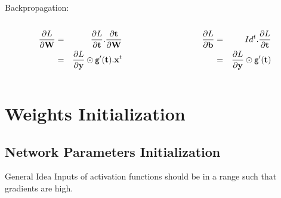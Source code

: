 \documentclass{book}
\newcommand{\x}{\mathbf{x}}
\newcommand{\y}{\mathbf{y}}
\newcommand{\W}{\mathbf{W}} %
\newcommand{\bias}{\mathbf{b}}%
\newcommand{\act}{\texttt{g}}%
\newcommand{\loss}{L}
\begin{document}
Backpropagation:
\begin{columns}
\begin{column}{.5\textwidth}
\begin{eqnarray*}
\pdv{\loss}{\W} &=& \pdv{\loss}{\mathbf{t}}.\pdv{\mathbf{t}}{\W} \\
&=& \pdv{\loss}{\y} \odot \act'(\mathbf{t}).\x^t
\end{eqnarray*}
\end{column}
\begin{column}{.5\textwidth}
\begin{eqnarray*}
\pdv{\loss}{\bias} &=& Id^t . \pdv{\loss}{\mathbf{t}}\\
&=& \pdv{\loss}{\y} \odot \act'(\mathbf{t})
\end{eqnarray*}
\end{column}
\end{columns}

\section{Weights Initialization}

\subsection{Network Parameters Initialization}

\begin{block}{General Idea}
Inputs of activation functions should be in a range such that gradients are high.
\end{block}
\end{document}
